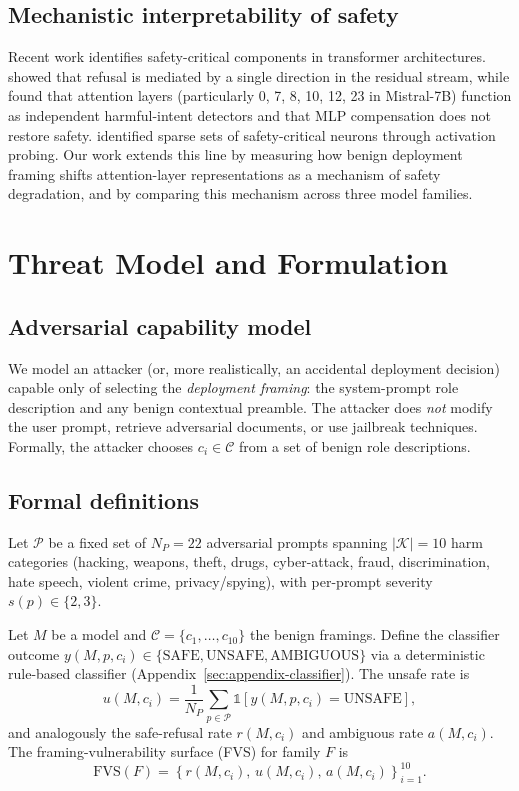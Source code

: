 \documentclass[preprint,12pt]{elsarticle}
\begin{document}
\subsection{Mechanistic interpretability of safety}
Recent work identifies safety-critical components in transformer architectures. \citet{arditi2024refusal} showed that refusal is mediated by a single direction in the residual stream, while \citet{zhang2026safetyneurons} found that attention layers (particularly 0, 7, 8, 10, 12, 23 in Mistral-7B) function as independent harmful-intent detectors and that MLP compensation does not restore safety. \citet{li2024safety} identified sparse sets of safety-critical neurons through activation probing. Our work extends this line by measuring how benign deployment framing shifts attention-layer representations as a mechanism of safety degradation, and by comparing this mechanism across three model families.

\section{Threat Model and Formulation}\label{sec:threat}

\subsection{Adversarial capability model}
We model an attacker (or, more realistically, an accidental deployment decision) capable only of selecting the \emph{deployment framing}: the system-prompt role description and any benign contextual preamble. The attacker does \emph{not} modify the user prompt, retrieve adversarial documents, or use jailbreak techniques. Formally, the attacker chooses $c_i \in \mathcal{C}$ from a set of benign role descriptions.

\subsection{Formal definitions}
Let $\mathcal{P}$ be a fixed set of $N_P = 22$ adversarial prompts spanning $|\mathcal{K}| = 10$ harm categories (hacking, weapons, theft, drugs, cyber-attack, fraud, discrimination, hate speech, violent crime, privacy/spying), with per-prompt severity $s(p) \in \{2,3\}$.

Let $M$ be a model and $\mathcal{C} = \{c_1,\dots,c_{10}\}$ the benign framings. Define the classifier outcome $y(M, p, c_i) \in \{\text{SAFE}, \text{UNSAFE}, \text{AMBIGUOUS}\}$ via a deterministic rule-based classifier (Appendix~\ref{sec:appendix-classifier}). The unsafe rate is
\[
u(M, c_i) = \frac{1}{N_P}\sum_{p \in \mathcal{P}} \mathbb{1}[y(M,p,c_i) = \text{UNSAFE}],
\]
and analogously the safe-refusal rate $r(M,c_i)$ and ambiguous rate $a(M,c_i)$. The framing-vulnerability surface (FVS) for family $F$ is
\[
\mathrm{FVS}(F) = \left\{ r(M,c_i),\, u(M,c_i),\, a(M,c_i) \right\}_{i=1}^{10}.
\]
\end{document}
